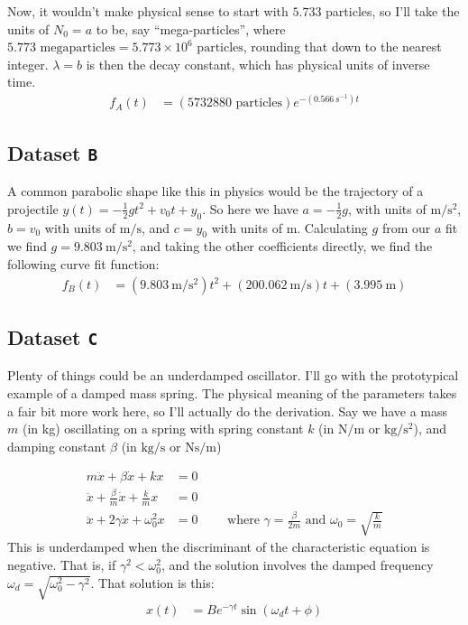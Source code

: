 \documentclass{article}
\begin{document}
Now, it wouldn't make physical sense to start with $5.733$ particles, so I'll take the units of $N_0 = a$ to be, 
say ``mega-particles'', where $5.773 \text{ megaparticles} = 5.773 \times 10^{6} \text{ particles}$, rounding
that down to the nearest integer. $\lambda = b$ is then the decay constant, which has physical units of 
inverse time.
\begin{align*}
    f_A(t) &= \left(5732880 \text{ particles}\right)e^{-\left(\qty{0.566}{\second^{-1}}\right)t}
\end{align*}

\subsection{Dataset \texttt{B}}
A common parabolic shape like this in physics would be the trajectory of a projectile $y(t) = 
-\frac{1}{2}gt^2 + v_0t + y_0$. So here we have $a = -\frac{1}{2}g$, with units of 
$\unit{\meter\per\square\second}$, $b = v_0$ with units of $\unit{\meter\per\second}$, and $c = y_0$ 
with units of $\text{m}$. Calculating $g$ from our $a$ fit we find $g = \qty{9.803}{\meter\per\second\squared}$,
and taking the other coefficients directly, we find the following curve fit function:
\begin{align*}
    f_B(t) &= \left(\qty{9.803}{\meter\per\square\second}\right)t^2 + 
    \left(\qty{200.062}{\meter\per\second}\right)t + \left(\qty{3.995}{\meter}\right)
\end{align*}

\subsection{Dataset \texttt{C}}
Plenty of things could be an underdamped oscillator. I'll go with the prototypical example of a damped mass 
spring. The physical meaning of the parameters takes a fair bit more work here, so I'll actually do the 
derivation. Say we have a mass $m$ (in kg) oscillating on a spring with spring constant $k$ (in 
$\unit{\newton\per\meter}$ or $\unit{\kilo\gram\per\square\second}$), and damping constant $\beta$ 
(in $\unit{\kilo\gram\per\second}$ or $\unit{\newton\second\per\meter}$)

\begin{align*}
    m\ddot{x} + \beta\dot{x} + kx &= 0 \\
    \ddot{x} + \frac{\beta}{m}\dot{x} + \frac{k}{m}x &= 0 \\
    \ddot{x} + 2\gamma\dot{x} + \omega_0^2x &= 0 \qquad \text{ where } \gamma = \frac{\beta}{2m} \text{ and } \omega_0 = \sqrt{\frac{k}{m}}
\end{align*}
This is underdamped when the discriminant of the characteristic equation is negative. That is, if 
$\gamma^2 < \omega_0^2$, and the solution involves the damped frequency 
$\omega_d = \sqrt{\omega_0^2 - \gamma^2}$. That solution is this:
\begin{align*}
    x(t) &= Be^{-\gamma t}\sin\left(\omega_d t + \phi\right)
\end{align*}
\end{document}
